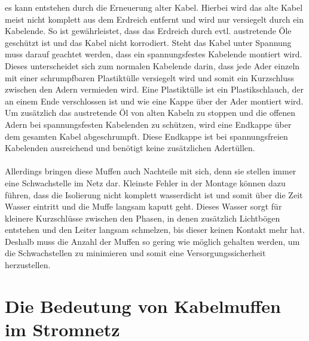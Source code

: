 es kann entstehen durch die Erneuerung alter Kabel. Hierbei wird das alte Kabel meist nicht komplett aus dem Erdreich entfernt und wird nur versiegelt durch 
ein Kabelende. So ist gewährleistet, dass das Erdreich durch evtl. austretende Öle geschützt ist und das Kabel nicht korrodiert. Steht das Kabel unter 
Spannung muss darauf geachtet werden, dass ein spannungsfestes Kabelende montiert wird. Dieses unterscheidet sich zum normalen Kabelende darin, dass jede 
Ader einzeln mit einer schrumpfbaren Plastiktülle versiegelt wird und somit ein Kurzschluss zwischen den Adern vermieden wird. Eine Plastiktülle ist ein 
Plastikschlauch, der an einem Ende verschlossen ist und wie eine Kappe über der Ader montiert wird. Um zusätzlich das austretende Öl von alten Kabeln zu 
stoppen und die offenen Adern bei \zB spannungsfesten Kabelenden zu schützen, wird eine Endkappe über dem gesamten Kabel abgeschrumpft. Diese Endkappe ist 
bei spannungsfreien Kabelenden ausreichend und benötigt keine zusätzlichen Adertüllen. \autocite{Cellpack}
\\\\
Allerdings bringen diese Muffen auch Nachteile mit sich, denn sie stellen immer eine Schwachstelle im Netz dar. Kleinste Fehler in der Montage können dazu 
führen, dass die Isolierung nicht komplett wasserdicht ist und somit über die Zeit Wasser eintritt und die Muffe langsam kaputt geht. Dieses Wasser sorgt 
für kleinere Kurzschlüsse zwischen den Phasen, in denen zusätzlich Lichtbögen entstehen und den Leiter langsam schmelzen, bis dieser keinen Kontakt mehr hat. 
Deshalb muss die Anzahl der Muffen so gering wie möglich gehalten werden, um die Schwachstellen zu minimieren und somit eine Versorgungssicherheit 
herzustellen. 
\clearpage

\section{Die Bedeutung von Kabelmuffen im Stromnetz}

